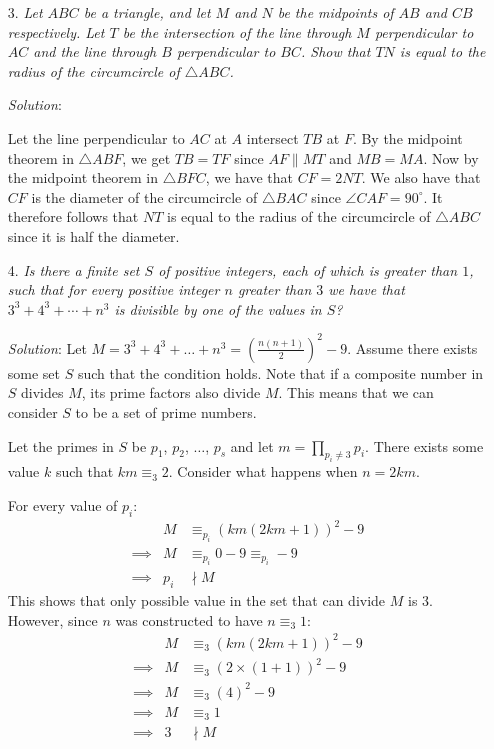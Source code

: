 \documentclass{article}
\begin{document}
\begin{enumerate}
\item[3.] %
\textit{Let $ABC$ be a triangle, and let $M$ and $N$ be the midpoints of $AB$ and $CB$ respectively.
Let $T$ be the intersection of the line through $M$ perpendicular to $AC$ and the line through $B$ perpendicular to $BC$.
Show that $TN$ is equal to the radius of the circumcircle of $\triangle ABC$.}

\textit{Solution}:

Let the line perpendicular to $AC$ at $A$ intersect $TB$ at $F$.
By the midpoint theorem in $\triangle ABF$, we get $TB=TF$ since $AF\parallel MT$ and $MB=MA$.
Now by the midpoint theorem in $\triangle BFC$, we have that $CF=2NT$.
We also have that $CF$ is the diameter of the circumcircle of $\triangle BAC$ since $\angle CAF=90^\circ$.
It therefore follows that $NT$ is equal to the radius of the circumcircle of $\triangle ABC$ since it is half the diameter.


\item[4.] %
\textit{Is there a finite set $S$ of positive integers, each of which is greater than $1$, such that for every positive integer $n$ greater than $3$ we have that $3^3 +4^3 +\dotsb +n^3$ is divisible by one of the values in $S$?}

\textit{Solution}:
Let $M = 3^3 + 4^3 + \dots + n^3 = \left(\frac{n(n + 1)}{2}\right)^2 - 9$.
Assume there exists some set $S$ such that the condition holds.
Note that if a composite number in $S$ divides $M$, its prime factors also divide $M$.
This means that we can consider $S$ to be a set of prime numbers.

Let the primes in $S$ be $p_1$, $p_2$, $\dots$, $p_s$ and let $m = \prod_{p_i \neq 3}p_i$.
There exists some value $k$ such that $km \equiv _3 2$.
Consider what happens when $n = 2km$.

For every value of $p_i$:
\begin{align*}
  && M &\equiv _{p_i} (km(2km + 1))^2 - 9 \\
  &\implies& M &\equiv _{p_i} 0 - 9 \equiv_{p_i} -9 \\
  &\implies& p_i &\nmid M &
\end{align*}
This shows that only possible value in the set that can divide $M$ is $3$.
However, since $n$ was constructed to have $n \equiv _3 1$:
\begin{align*}
  &&M &\equiv _3 (km(2km + 1))^2 - 9 \\
  &\implies& M &\equiv _3 (2 \times (1 + 1))^2 - 9 \\
  &\implies& M &\equiv _3 (4)^2 - 9 \\
  &\implies& M &\equiv _3 1 \\
  &\implies& 3 &\nmid M &
\end{align*}


\end{enumerate}
\end{document}
